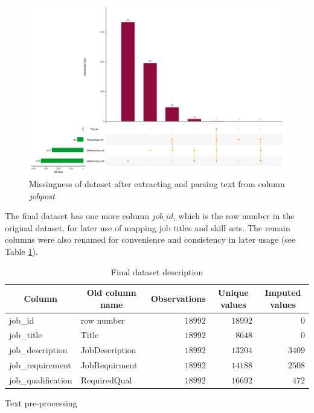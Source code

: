 \documentclass[a4paper,man,floatsintext,natbib,noextraspace]{apa6}
\makeatletter
\renewcommand{\subsection}{\@startsection{subsection}{2}
  {\z@}
  {\b@level@two@skip}
  {\e@level@two@skip}
  {\normalfont\normalsize\bfseries}}
\makeatother
\begin{document}
\begin{figure}
    \centering
    \includegraphics[width=\textwidth]{retrieval_missingness.png}
    \caption{Missingness of dataset after extracting and parsing text from column $jobpost$
    \label{fig:retrieval_missingness}}
\end{figure}

The final dataset has one more column $job\_id$, which is the row number in the original dataset, for later use of mapping job titles and skill sets. The remain columns were also renamed for convenience and consistency in later usage (see Table \ref{tbl:final_data_description}).

\begin{table}[!tbp]
    \caption{Final dataset description\label{tbl:final_data_description}} 
    \begin{center}
    \begin{tabular}{llrrr}
    \hline\hline
    \multicolumn{1}{c}{Column}&\multicolumn{1}{c}{Old column name}&\multicolumn{1}{c}{Observations}&\multicolumn{1}{c}{Unique values}&\multicolumn{1}{c}{Imputed values}\tabularnewline
    \hline
    job\_id&row number&$18992$&$18992$&$   0$\tabularnewline
    job\_title&Title&$18992$&$ 8648$&$   0$\tabularnewline
    job\_description&JobDescription&$18992$&$13204$&$3409$\tabularnewline
    job\_requirement&JobRequirment&$18992$&$14188$&$2508$\tabularnewline
    job\_qualification&RequiredQual&$18992$&$16692$&$ 472$\tabularnewline
    \hline
    \end{tabular}\end{center}
    \end{table}

\subsection{Text pre-processing}
\end{document}
